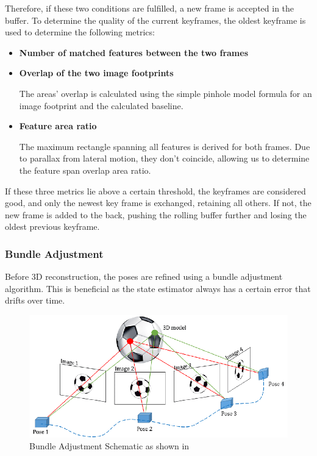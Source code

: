 Therefore, if these two conditions are fulfilled, a new frame is accepted in the buffer. To determine the quality of the current keyframes, the oldest keyframe is used to determine the following metrics:

\begin{itemize}
    \item \textbf{Number of matched features between the two frames}
    \item \textbf{Overlap of the two image footprints}
    
    The areas' overlap is calculated using the simple pinhole model formula for an image footprint and the calculated baseline.
    \item \textbf{Feature area ratio}
    
    The maximum rectangle spanning all features is derived for both frames. Due to parallax from lateral motion, they don't coincide, allowing us to determine the feature span overlap area ratio.
\end{itemize}

If these three metrics lie above a certain threshold, the keyframes are considered good, and only the newest key frame is exchanged, retaining all others. If not, the new frame is added to the back, pushing the rolling buffer further and losing the oldest previous keyframe. 

\subsubsection{Bundle Adjustment}

Before 3D reconstruction, the poses are refined using a bundle adjustment algorithm. This is beneficial as the state estimator always has a certain error that drifts over time. 

\begin{figure}[ht!]
    \centering
    \includegraphics[scale=0.5]{images/system_overview/BA.png}
    \caption{Bundle Adjustment Schematic as shown in \citet{BA}}
    \label{fig:BA}
\end{figure}

